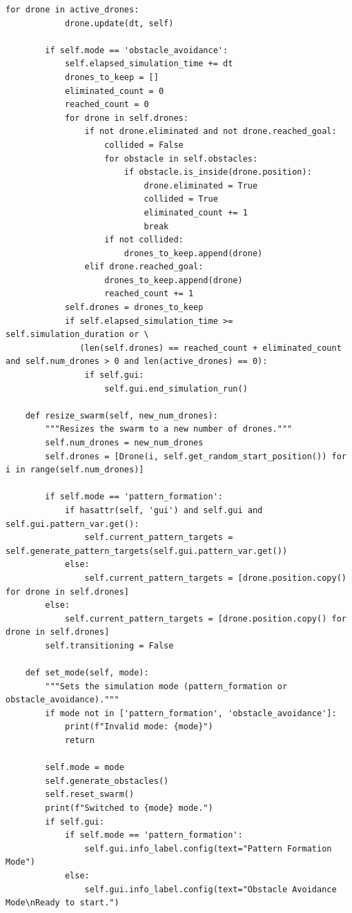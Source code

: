 \documentclass[11pt]{article}
\begin{document}
\begin{lstlisting}[style=pythonstyle]
        for drone in active_drones:
            drone.update(dt, self)

        if self.mode == 'obstacle_avoidance':
            self.elapsed_simulation_time += dt
            drones_to_keep = []
            eliminated_count = 0
            reached_count = 0
            for drone in self.drones:
                if not drone.eliminated and not drone.reached_goal:
                    collided = False
                    for obstacle in self.obstacles:
                        if obstacle.is_inside(drone.position):
                            drone.eliminated = True
                            collided = True
                            eliminated_count += 1
                            break
                    if not collided:
                        drones_to_keep.append(drone)
                elif drone.reached_goal:
                    drones_to_keep.append(drone)
                    reached_count += 1
            self.drones = drones_to_keep
            if self.elapsed_simulation_time >= self.simulation_duration or \
               (len(self.drones) == reached_count + eliminated_count and self.num_drones > 0 and len(active_drones) == 0):
                if self.gui:
                    self.gui.end_simulation_run()

    def resize_swarm(self, new_num_drones):
        """Resizes the swarm to a new number of drones."""
        self.num_drones = new_num_drones
        self.drones = [Drone(i, self.get_random_start_position()) for i in range(self.num_drones)]

        if self.mode == 'pattern_formation':
            if hasattr(self, 'gui') and self.gui and self.gui.pattern_var.get():
                self.current_pattern_targets = self.generate_pattern_targets(self.gui.pattern_var.get())
            else:
                self.current_pattern_targets = [drone.position.copy() for drone in self.drones]
        else:
            self.current_pattern_targets = [drone.position.copy() for drone in self.drones]
        self.transitioning = False

    def set_mode(self, mode):
        """Sets the simulation mode (pattern_formation or obstacle_avoidance)."""
        if mode not in ['pattern_formation', 'obstacle_avoidance']:
            print(f"Invalid mode: {mode}")
            return

        self.mode = mode
        self.generate_obstacles()
        self.reset_swarm()
        print(f"Switched to {mode} mode.")
        if self.gui:
            if self.mode == 'pattern_formation':
                self.gui.info_label.config(text="Pattern Formation Mode")
            else:
                self.gui.info_label.config(text="Obstacle Avoidance Mode\nReady to start.")


\end{lstlisting}
\end{document}
